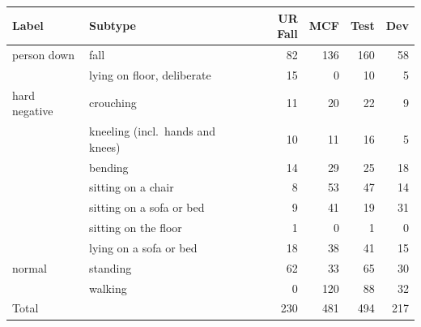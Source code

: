 \begin{tabular}{llrrrr}
\toprule
Label & Subtype & UR Fall & MCF & Test & Dev \\
\midrule
person down & fall & 82 & 136 & 160 & 58 \\
 & lying on floor, deliberate & 15 & 0 & 10 & 5 \\
\midrule
hard negative & crouching & 11 & 20 & 22 & 9 \\
 & kneeling (incl.\ hands and knees) & 10 & 11 & 16 & 5 \\
 & bending & 14 & 29 & 25 & 18 \\
 & sitting on a chair & 8 & 53 & 47 & 14 \\
 & sitting on a sofa or bed & 9 & 41 & 19 & 31 \\
 & sitting on the floor & 1 & 0 & 1 & 0 \\
 & lying on a sofa or bed & 18 & 38 & 41 & 15 \\
\midrule
normal & standing & 62 & 33 & 65 & 30 \\
 & walking & 0 & 120 & 88 & 32 \\
\midrule
Total & & 230 & 481 & 494 & 217 \\
\bottomrule
\end{tabular}
